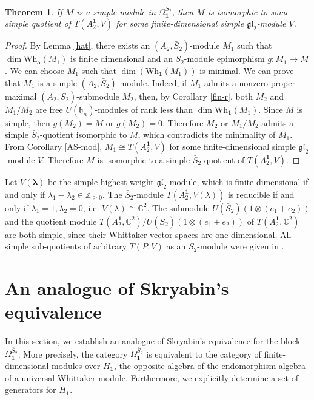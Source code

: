 \documentclass[12pt,a4paper]{amsart}
\newtheorem{Theorem}{Theorem}[section]
\def\Z{\mathbb{Z}}
\def\C{\mathbb{C}}
\def\ba{\mathbf{a}}
\def\gl{\mathfrak{gl}}
\def\bS{\bar{S}_2}
\begin{document}
\begin{Theorem}\label{simple-S}
If $M$ is a simple module in $\Omega^{\bar{S}_2}_{\mathbf{1}}$, then $M$ is isomorphic to some simple quotient of $T(A^{\mathbf{1}}_{2},V)$ for some finite-dimensional simple $\mathfrak{gl}_2$-module $V$.
\end{Theorem}
\begin{proof} By Lemma \ref{hat}, there exists an $(A_2, \bar{S}_2)$-module $M_1$ such that
$\dim{\text{Wh}_{\ba}(M_1)}$ is finite dimensional and an $\bar{S}_2$-module epimorphism $g:M_1 \rightarrow M$.
We can choose $M_1$ such that $\dim(\text{Wh}_{\mathbf{1}}(M_1))$ is minimal. We can  prove that $M_1$ is  a simple $(A_2, \bar{S}_2)$-module.
Indeed, if  $M_1$  admits a nonzero proper maximal $(A_2, \bar{S}_2)$-submodule $M_2$, then, by Corollary \ref{fin-r}, both $M_2$ and $M_1/M_2$ are free $U(\mathfrak{h}_n)$-modules of rank less than $\dim \text{Wh}_{\mathbf{1}}(M_1)$.
Since $M$ is simple, then $g(M_2)= M$ or $g(M_2)=0$. Therefore $M_2$ or $M_1/M_2$ admits a simple $\bar{S}_2$-quotient isomorphic to $M$, which contradicts the minimality of $M_1$. From Corollary \ref{AS-mod}, $M_1 \cong T(A^{\mathbf{1}}_2, V)$ for some finite-dimensional simple $\mathfrak{gl}_2$-module $V$.  Therefore $M$ is isomorphic to a simple $\bar{S}_2$-quotient of $T(A^{\mathbf{1}}_2, V)$.
\end{proof}

 Let $V(\mathbf{\lambda})$ be the simple highest weight $\gl_2$-module,
which is finite-dimensional if and only if $\lambda_1-\lambda_2\in \Z_{\geq 0}$.  The $\bar{S}_2$-module $T(A^{\mathbf{1}}_{2},V(\lambda))$ is  reducible
if and only if $\lambda_1=1,\lambda_2=0$, i.e. $V(\lambda)\cong \C^2$. The submodule $U(\bar{S}_2)(1\otimes (e_1+e_2))$ and the quotient module $T(A^{\mathbf{1}}_{2},\C^2)/U(\bar{S}_2)(1\otimes (e_1+e_2))$ of $T(A^{\mathbf{1}}_{2},\C^2)$  are both simple, since their Whittaker vector spaces are one dimensional.
All simple sub-quotients of arbitrary  $T(P,V)$ as an $S_2$-module were given in \cite{HL2}.

\section{An analogue of Skryabin's equivalence}

In this section, we establish an analogue of Skryabin's equivalence for the block $\Omega^{\bar{S}_2}_{\mathbf{1}}$.
More precisely, the category $\Omega_{\mathbf{1}}^{\bS}$ is equivalent to the category of finite-dimensional modules over $H_{\mathbf{1}}$, the opposite algebra of the endomorphism algebra of a universal Whittaker module. Furthermore, we explicitly determine a set of generators for  $H_{\mathbf{1}}$.
\end{document}
